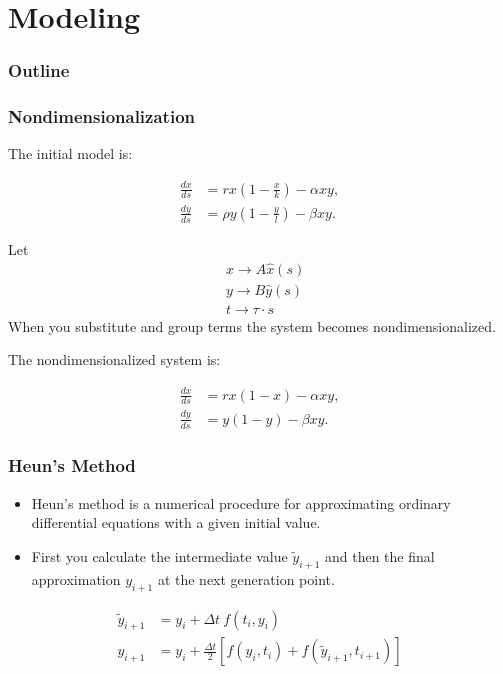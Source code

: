 \section{Modeling}

\begin{frame}
  \frametitle{Outline}
  \tableofcontents[ currentsection ]
\end{frame}

\begin{frame}
\frametitle{Nondimensionalization}

The initial model is:

  \begin{align*}
    \frac{dx}{ds} & = rx \left(1-\frac{x}{k}\right) - \alpha xy, \\
    \frac{dy}{ds} & = \rho y \left(1-\frac{y}{l}\right) - \beta xy.
  \end{align*}
	
Let 
\begin{align*}
		& x \rightarrow A \hat{x} (s) \\
		& y \rightarrow B \hat{y} (s) \\
		& t \rightarrow \tau \cdot s
\end{align*}
When you substitute and group terms the system becomes nondimensionalized. 
\end{frame}

\begin{frame}
The nondimensionalized system is:

	\begin{align*}
		\frac{d{x}}{ds} &= rx(1-x) - \alpha xy, \\
		\frac{d{y}}{ds} &= y(1-y) - \beta xy.
	\end{align*}
\end{frame}


\begin{frame}
\frametitle{Heun's Method}
\begin{itemize}
\item Heun's method is a numerical procedure for approximating ordinary differential equations with a given initial value.
\item First you calculate the intermediate value $\tilde{y}_{i+1}$ and then the final approximation $y_{i+1}$ at the next generation point.
\end{itemize}

\begin{align*}
	\tilde{y}_{i+1} &= y_i + \Delta t \ f(t_i, y_i) \\
	y_{i+1} &= y_i + \frac{\Delta t}{2} \left[f(y_i,t_i) + f(\tilde{y}_{i+1}, t_{i+1})\right]
\end{align*}
\end{frame}
